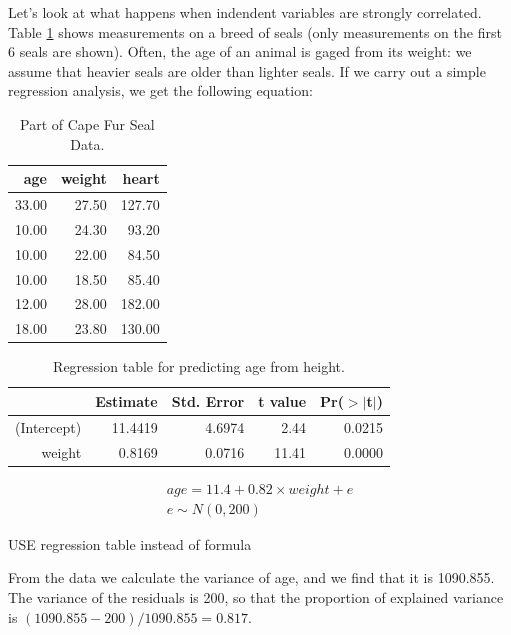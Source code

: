 \documentclass[]{book}\usepackage[]{graphicx}\usepackage[]{color}
\begin{document}
Let's look at what happens when indendent variables are strongly correlated. Table \ref{tab:multi_2} shows measurements on a breed of seals (only measurements on the first 6 seals are shown). Often, the age of an animal is gaged from its weight: we assume that heavier seals are older than lighter seals. If we carry out a simple regression analysis, we get the following equation:


\begin{table}[ht]
\centering
\caption{Part of Cape Fur Seal Data.} 
\label{tab:multi_2}
\begin{tabular}{rrr}
  \hline
age & weight & heart \\ 
  \hline
33.00 & 27.50 & 127.70 \\ 
  10.00 & 24.30 & 93.20 \\ 
  10.00 & 22.00 & 84.50 \\ 
  10.00 & 18.50 & 85.40 \\ 
  12.00 & 28.00 & 182.00 \\ 
  18.00 & 23.80 & 130.00 \\ 
   \hline
\end{tabular}
\end{table}



\begin{table}[ht]
\centering
\caption{Regression table for predicting age from height.} 
\label{tab:multi_2a}
\begin{tabular}{rrrrr}
  \hline
 & Estimate & Std. Error & t value & Pr($>$$|$t$|$) \\ 
  \hline
(Intercept) & 11.4419 & 4.6974 & 2.44 & 0.0215 \\ 
  weight & 0.8169 & 0.0716 & 11.41 & 0.0000 \\ 
   \hline
\end{tabular}
\end{table}



\begin{eqnarray}
age = 11.4 + 0.82 \times  weight + e \\
e \sim N(0, 200)
\end{eqnarray}




USE regression table instead of formula




From the data we calculate the variance of age, and we find that it is 1090.855. The variance of the residuals is 200, so that the proportion of explained variance is $(1090.855-200)/1090.855  = 0.817$.
\end{document}
